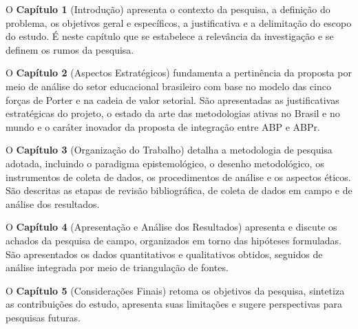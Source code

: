 O \textbf{Capítulo 1} (Introdução) apresenta o contexto da pesquisa, a definição do problema, os objetivos geral e específicos, a justificativa e a delimitação do escopo do estudo. É neste capítulo que se estabelece a relevância da investigação e se definem os rumos da pesquisa.

O \textbf{Capítulo 2} (Aspectos Estratégicos) fundamenta a pertinência da proposta por meio de análise do setor educacional brasileiro com base no modelo das cinco forças de Porter e na cadeia de valor setorial. São apresentadas as justificativas estratégicas do projeto, o estado da arte das metodologias ativas no Brasil e no mundo e o caráter inovador da proposta de integração entre ABP e ABPr.

O \textbf{Capítulo 3} (Organização do Trabalho) detalha a metodologia de pesquisa adotada, incluindo o paradigma epistemológico, o desenho metodológico, os instrumentos de coleta de dados, os procedimentos de análise e os aspectos éticos. São descritas as etapas de revisão bibliográfica, de coleta de dados em campo e de análise dos resultados.

O \textbf{Capítulo 4} (Apresentação e Análise dos Resultados) apresenta e discute os achados da pesquisa de campo, organizados em torno das hipóteses formuladas. São apresentados os dados quantitativos e qualitativos obtidos, seguidos de análise integrada por meio de triangulação de fontes.

O \textbf{Capítulo 5} (Considerações Finais) retoma os objetivos da pesquisa, sintetiza as contribuições do estudo, apresenta suas limitações e sugere perspectivas para pesquisas futuras.

